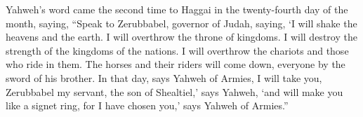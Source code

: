  Yahweh's word came the second time to Haggai in the
twenty-fourth day of the month, saying,  ``Speak to
Zerubbabel, governor of Judah, saying, `I will shake the heavens and the
earth.  I will overthrow the throne of kingdoms. I will
destroy the strength of the kingdoms of the nations. I will overthrow
the chariots and those who ride in them. The horses and their riders
will come down, everyone by the sword of his brother.  In
that day, says Yahweh of Armies, I will take you, Zerubbabel my servant,
the son of Shealtiel,' says Yahweh, `and will make you like a signet
ring, for I have chosen you,' says Yahweh of Armies.''
